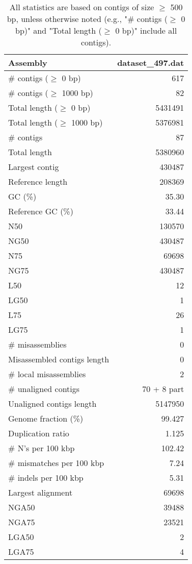 \documentclass[12pt,a4paper]{article}
\begin{document}
\begin{table}[ht]
\begin{center}
\caption{All statistics are based on contigs of size $\geq$ 500 bp, unless otherwise noted (e.g., "\# contigs ($\geq$ 0 bp)" and "Total length ($\geq$ 0 bp)" include all contigs).}
\begin{tabular}{|l*{1}{|r}|}
\hline
Assembly & dataset\_497.dat \\ \hline
\# contigs ($\geq$ 0 bp) & 617 \\ \hline
\# contigs ($\geq$ 1000 bp) & 82 \\ \hline
Total length ($\geq$ 0 bp) & 5431491 \\ \hline
Total length ($\geq$ 1000 bp) & 5376981 \\ \hline
\# contigs & 87 \\ \hline
Total length & 5380960 \\ \hline
Largest contig & 430487 \\ \hline
Reference length & 208369 \\ \hline
GC (\%) & 35.30 \\ \hline
Reference GC (\%) & 33.44 \\ \hline
N50 & 130570 \\ \hline
NG50 & 430487 \\ \hline
N75 & 69698 \\ \hline
NG75 & 430487 \\ \hline
L50 & 12 \\ \hline
LG50 & 1 \\ \hline
L75 & 26 \\ \hline
LG75 & 1 \\ \hline
\# misassemblies & 0 \\ \hline
Misassembled contigs length & 0 \\ \hline
\# local misassemblies & 2 \\ \hline
\# unaligned contigs & 70 + 8 part \\ \hline
Unaligned contigs length & 5147950 \\ \hline
Genome fraction (\%) & 99.427 \\ \hline
Duplication ratio & 1.125 \\ \hline
\# N's per 100 kbp & 102.42 \\ \hline
\# mismatches per 100 kbp & 7.24 \\ \hline
\# indels per 100 kbp & 5.31 \\ \hline
Largest alignment & 69698 \\ \hline
NGA50 & 39488 \\ \hline
NGA75 & 23521 \\ \hline
LGA50 & 2 \\ \hline
LGA75 & 4 \\ \hline
\end{tabular}
\end{center}
\end{table}
\end{document}
